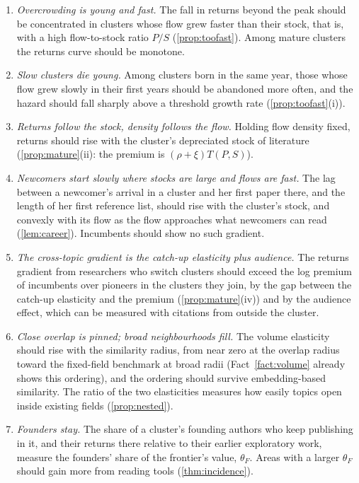\begin{enumerate}[label=\textbf{P\arabic*.},leftmargin=*]
\item \emph{Overcrowding is young and fast.} The fall in returns beyond the peak
should be concentrated in clusters whose flow grew faster than their stock, that
is, with a high flow-to-stock ratio $P/S$ (\cref{prop:toofast}). Among mature
clusters the returns curve should be monotone.
\item \emph{Slow clusters die young.} Among clusters born in the same year, those
whose flow grew slowly in their first years should be abandoned more often, and
the hazard should fall sharply above a threshold growth rate
(\cref{prop:toofast}(i)).
\item \emph{Returns follow the stock, density follows the flow.} Holding flow
density fixed, returns should rise with the cluster's depreciated stock of
literature (\cref{prop:mature}(ii): the premium is $(\rho+\xi)T(P,S)$).
\item \emph{Newcomers start slowly where stocks are large and flows are fast.}
The lag between a newcomer's arrival in a cluster and her first paper there, and
the length of her first reference list, should rise with the cluster's stock,
and convexly with its flow as the flow approaches what newcomers can read
(\cref{lem:career}). Incumbents should show no such gradient.
\item \emph{The cross-topic gradient is the catch-up elasticity plus audience.}
The returns gradient from researchers who switch clusters should exceed the log
premium of incumbents over pioneers in the clusters they join, by the gap
between the catch-up elasticity and the premium (\cref{prop:mature}(iv)) and by
the audience effect, which can be measured with citations from outside the
cluster.
\item \emph{Close overlap is pinned; broad neighbourhoods fill.} The volume
elasticity should rise with the similarity radius, from near zero at the overlap
radius toward the fixed-field benchmark at broad radii (Fact~\ref{fact:volume}
already shows this ordering), and the ordering should survive embedding-based
similarity. The ratio of the two elasticities measures how easily topics open
inside existing fields (\cref{prop:nested}).
\item \emph{Founders stay.} The share of a cluster's founding authors who keep
publishing in it, and their returns there relative to their earlier exploratory
work, measure the founders' share of the frontier's value, $\theta_F$. Areas with
a larger $\theta_F$ should gain more from reading tools (\cref{thm:incidence}).

\end{enumerate}
